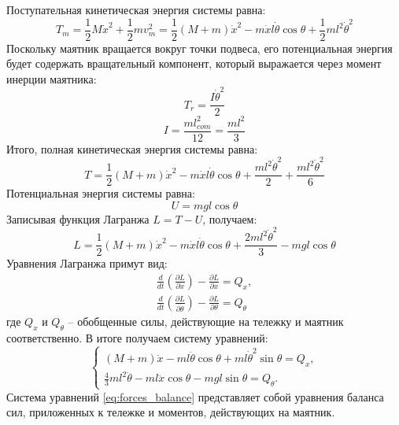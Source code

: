 Поступательная кинетическая энергия системы равна:
\begin{equation}
    T_m = \frac{1}{2}M\dot{x}^2 + \frac{1}{2}m v_m^2 =  \frac{1}{2} (M + m)\dot{x}^2 - m\dot{x}l\dot{\theta}\cos\theta + \frac{1}{2}ml^2\dot{\theta}^2
\end{equation}
Поскольку маятник вращается вокруг точки подвеса, его потенциальная энергия будет содержать 
вращательный компонент, который выражается через момент инерции маятника: 
\begin{equation}
    T_r = \frac{I\dot{\theta}^2}{2}
\end{equation}
\begin{equation}
    I = \frac{ml_{com}^2}{12} = \frac{ml^2}{3}
\end{equation}
Итого, полная кинетическая энергия системы равна: 
\begin{equation}
    T = \frac{1}{2} (M + m)\dot{x}^2 - m\dot{x}l\dot{\theta}\cos\theta + \frac{ml^2\dot{\theta}^2}{2} + \frac{ml^2\dot{\theta}^2}{6} 
\end{equation}  
Потенциальная энергия системы равна:
\begin{equation}
    U = mgl\cos\theta
\end{equation}
Записывая функция Лагранжа $L = T - U$, получаем: 
\begin{equation}
    L = \frac{1}{2} (M + m)\dot{x}^2 - m\dot{x}l\dot{\theta}\cos\theta + \frac{2ml^2\dot{\theta}^2}{3} - mgl\cos\theta
\end{equation}
Уравнения Лагранжа примут вид:
\begin{equation}
    \begin{array}{cc}
        \frac{d}{dt} \left( \frac{\partial L}{\partial \dot{x}} \right) - \frac{\partial L}{\partial x} = Q_x, \\
        \frac{d}{dt} \left( \frac{\partial L}{\partial \dot{\theta}} \right) - \frac{\partial L}{\partial \theta} = Q_{\theta}
    \end{array}
\end{equation}
где $Q_x$ и $Q_{\theta}$ -- обобщенные силы, действующие на тележку и маятник соответственно. В итоге получаем систему уравнений:
\begin{equation}
    \begin{cases}
        (M + m)\ddot{x} - ml\ddot{\theta}\cos\theta + ml\dot{\theta}^2\sin\theta = Q_x, \\
        \frac{4}{3} ml^2\ddot{\theta} - ml\ddot{x}\cos\theta - mgl\sin\theta = Q_{\theta}.
    \end{cases}
    \label{eq:forces_balance}
\end{equation}
Система уравнений \eqref{eq:forces_balance} представляет собой уравнения баланса сил, 
приложенных к тележке и моментов, действующих на маятник.

